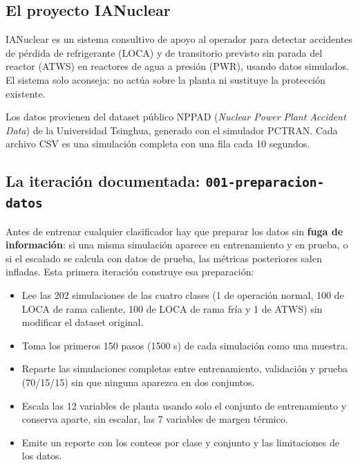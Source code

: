 \documentclass[12pt,a4paper]{article}
\begin{document}
\subsection{El proyecto IANuclear}
IANuclear es un sistema consultivo de apoyo al operador para detectar accidentes de pérdida de refrigerante (LOCA) y de transitorio previsto sin parada del reactor (ATWS) en reactores de agua a presión (PWR), usando datos simulados. El sistema solo aconseja: no actúa sobre la planta ni sustituye la protección existente.

Los datos provienen del dataset público NPPAD (\textit{Nuclear Power Plant Accident Data}) de la Universidad Tsinghua, generado con el simulador PCTRAN. Cada archivo CSV es una simulación completa con una fila cada 10 segundos.

\subsection{La iteración documentada: \texttt{001-preparacion-datos}}
Antes de entrenar cualquier clasificador hay que preparar los datos sin \textbf{fuga de información}: si una misma simulación aparece en entrenamiento y en prueba, o si el escalado se calcula con datos de prueba, las métricas posteriores salen infladas. Esta primera iteración construye esa preparación:

\begin{itemize}
  \item Lee las 202 simulaciones de las cuatro clases (1 de operación normal, 100 de LOCA de rama caliente, 100 de LOCA de rama fría y 1 de ATWS) sin modificar el dataset original.
  \item Toma los primeros 150 pasos (1500 s) de cada simulación como una muestra.
  \item Reparte las simulaciones completas entre entrenamiento, validación y prueba (70/15/15) sin que ninguna aparezca en dos conjuntos.
  \item Escala las 12 variables de planta usando solo el conjunto de entrenamiento y conserva aparte, sin escalar, las 7 variables de margen térmico.
  \item Emite un reporte con los conteos por clase y conjunto y las limitaciones de los datos.
\end{itemize}
\end{document}
